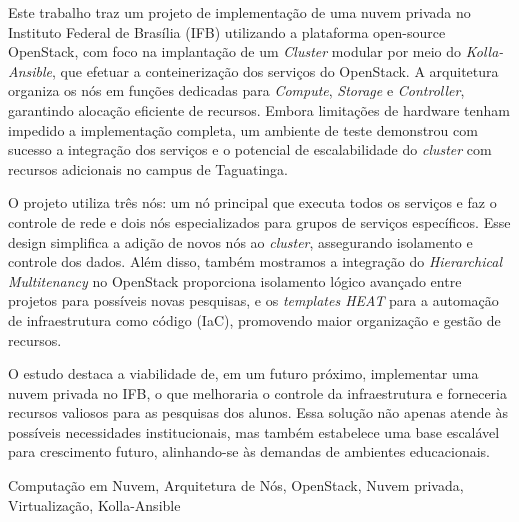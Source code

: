 
Este trabalho traz um projeto de implementação de uma nuvem privada no Instituto Federal de Brasília (IFB) utilizando a plataforma open-source OpenStack, com foco na implantação de um \textit{Cluster} modular por meio do \textit{Kolla-Ansible}, que efetuar a conteinerização dos serviços do OpenStack. A arquitetura organiza os nós em funções dedicadas para \textit{Compute}, \textit{Storage} e \textit{Controller}, garantindo alocação eficiente de recursos. Embora limitações de hardware tenham impedido a implementação completa, um ambiente de teste demonstrou com sucesso a integração dos serviços e o potencial de escalabilidade do \textit{cluster} com recursos adicionais no campus de Taguatinga.
    
O projeto utiliza três nós: um nó principal que executa todos os serviços e faz o controle de rede e dois nós especializados para grupos de serviços específicos. Esse design simplifica a adição de novos nós ao \textit{cluster}, assegurando isolamento e controle dos dados. Além disso, também mostramos a integração do \textit{Hierarchical Multitenancy} no OpenStack proporciona isolamento lógico avançado entre projetos para possíveis novas pesquisas, e os \textit{templates HEAT} para a automação de infraestrutura como código (IaC), promovendo maior organização e gestão de recursos.
    
O estudo destaca a viabilidade de, em um futuro próximo, implementar uma nuvem privada no IFB, o que melhoraria o controle da infraestrutura e forneceria recursos valiosos para as pesquisas dos alunos. Essa solução não apenas atende às possíveis necessidades institucionais, mas também estabelece uma base escalável para crescimento futuro, alinhando-se às demandas de ambientes educacionais.
 

\begin{keywords}
Computação em Nuvem, Arquitetura de Nós, OpenStack, Nuvem privada, Virtualização, Kolla-Ansible
\end{keywords}